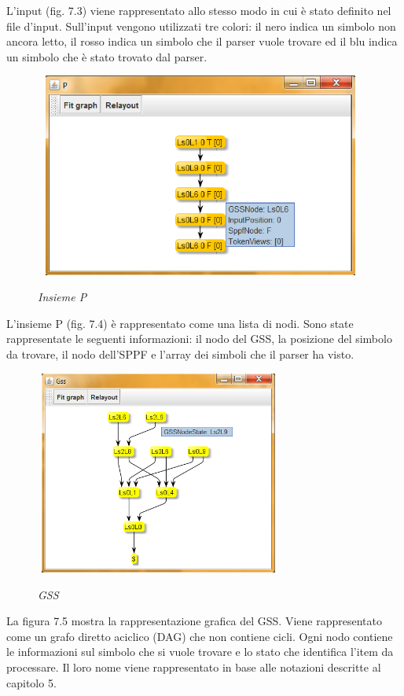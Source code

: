 \noindent L'input (fig. 7.3) viene rappresentato allo stesso modo in cui è stato definito nel file d'input. Sull'input vengono utilizzati tre colori: il nero indica un simbolo non ancora letto, il rosso indica un simbolo che il parser vuole trovare ed il blu indica un simbolo che è stato trovato dal parser.\par
\begin{figure}[hbpb]\label{insiemeP}
	\centering
	{\includegraphics[height=190pt,width=310pt,scale=0.1]{files/InsiemeP.png}}
	\caption{\textit{Insieme P}}
\end{figure}
\noindent L'insieme P (fig. 7.4) è rappresentato come una lista di nodi. Sono state rappresentate le seguenti informazioni: il nodo del GSS, la posizione del simbolo da trovare, il nodo dell'SPPF e l'array dei simboli che il parser ha visto.\par
\begin{figure}[hbpb]\label{gss}
	\centering
	{\includegraphics[height=190pt,width=230pt,scale=0.1]{files/GSS.png}}
	\caption{\textit{GSS}}
\end{figure}
\noindent La figura 7.5 mostra la rappresentazione grafica del GSS. Viene rappresentato come un grafo diretto aciclico (DAG) che non contiene cicli. Ogni nodo contiene le informazioni sul simbolo che si vuole trovare e lo stato che identifica l'item da processare. Il loro nome viene rappresentato in base alle notazioni descritte al capitolo 5.\par
